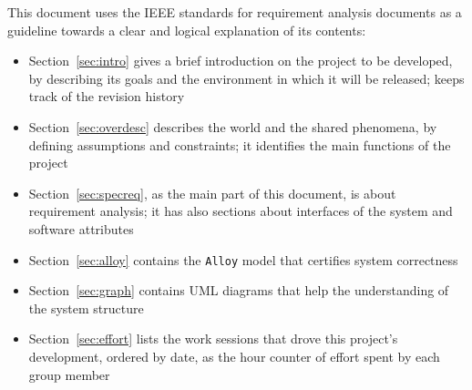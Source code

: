     This document uses the IEEE standards for requirement analysis documents \cite{ieee830} as a guideline towards a clear and logical explanation of its contents:
    \begin{itemize}
      \item Section~\ref{sec:intro} gives a brief introduction on the project to be developed, by describing its goals and the environment in which it will be released; keeps track of the revision history
      \item Section~\ref{sec:overdesc} describes the world and the shared phenomena, by defining assumptions and constraints; it identifies the main functions of the project
      \item Section~\ref{sec:specreq}, as the main part of this document, is about requirement analysis; it has also sections about interfaces of the system and software attributes
      \item Section~\ref{sec:alloy} contains the \texttt{Alloy} model that certifies system correctness
      \item Section~\ref{sec:graph} contains UML diagrams that help the understanding of the system structure
      \item Section~\ref{sec:effort} lists the work sessions that drove this project's development, ordered by date, as the hour counter of effort spent by each group member
    \end{itemize}
